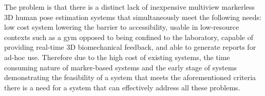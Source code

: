 \label{sec:problemstatement}

The problem is that there is a distinct lack of inexpensive multiview markerless 3D human pose estimation systems that simultaneously meet the following needs: low cost system lowering the barrier to accessibility, usable in low-resource contexts such as a gym opposed to being confined to the laboratory, capable of providing real-time 3D biomechanical feedback, and able to generate reports for ad-hoc use. Therefore due to the high cost of existing systems, the time consuming nature of marker-based systems and the early stage of systems demonstrating the feasibility of a system that meets the aforementioned criteria there is a need for a system that can effectively address all these problems.







 
